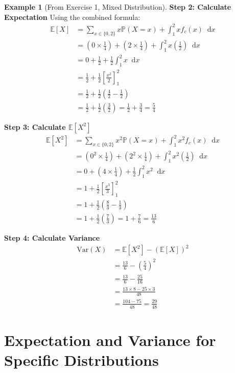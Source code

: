 \documentclass[11pt, letterpaper]{article}
\theoremstyle{plain} %
\theoremstyle{definition} %
\newtheorem{example}[theorem]{Example}
\theoremstyle{remark} %
\newcommand{\E}{\mathbb{E}}
\newcommand{\Var}{\mathrm{Var}}
\newcommand{\Prob}{\mathbb{P}}
\newcommand{\dee}{\mathop{}\!\mathrm{d}} %
\begin{document}
\begin{example}[From Exercise 1, Mixed Distribution]
\textbf{Step 2: Calculate Expectation}
Using the combined formula:
\begin{align*} \E[X] &= \sum_{x \in \{0, 2\}} x \Prob(X=x) + \int_1^2 x f_c(x) \dee x \\ &= (0 \times \frac{1}{4}) + (2 \times \frac{1}{4}) + \int_1^2 x \left(\frac{1}{2}\right) \dee x \\ &= 0 + \frac{1}{2} + \frac{1}{2} \int_1^2 x \dee x \\ &= \frac{1}{2} + \frac{1}{2} \left[\frac{x^2}{2}\right]_1^2 \\ &= \frac{1}{2} + \frac{1}{2} \left(\frac{4}{2} - \frac{1}{2}\right) \\ &= \frac{1}{2} + \frac{1}{2} \left(\frac{3}{2}\right) = \frac{1}{2} + \frac{3}{4} = \frac{5}{4} \end{align*}

\textbf{Step 3: Calculate $\E[X^2]$}
\begin{align*} \E[X^2] &= \sum_{x \in \{0, 2\}} x^2 \Prob(X=x) + \int_1^2 x^2 f_c(x) \dee x \\ &= (0^2 \times \frac{1}{4}) + (2^2 \times \frac{1}{4}) + \int_1^2 x^2 \left(\frac{1}{2}\right) \dee x \\ &= 0 + (4 \times \frac{1}{4}) + \frac{1}{2} \int_1^2 x^2 \dee x \\ &= 1 + \frac{1}{2} \left[\frac{x^3}{3}\right]_1^2 \\ &= 1 + \frac{1}{2} \left(\frac{8}{3} - \frac{1}{3}\right) \\ &= 1 + \frac{1}{2} \left(\frac{7}{3}\right) = 1 + \frac{7}{6} = \frac{13}{6} \end{align*}

\textbf{Step 4: Calculate Variance}
\begin{align*} \Var(X) &= \E[X^2] - (\E[X])^2 \\ &= \frac{13}{6} - \left(\frac{5}{4}\right)^2 \\ &= \frac{13}{6} - \frac{25}{16} \\ &= \frac{13 \times 8 - 25 \times 3}{48} \\ &= \frac{104 - 75}{48} = \frac{29}{48} \end{align*}
\end{example} %

\section{Expectation and Variance for Specific Distributions}
\end{document}
